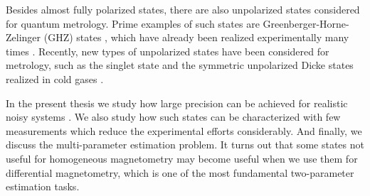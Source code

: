 Besides almost fully polarized states, there are also unpolarized states considered for quantum metrology.
Prime examples of such states are Greenberger-Horne-Zelinger (GHZ) states \cite{Greenberger1990}, which have already been realized experimentally many times \cite{Leibfried2004, Bouwmeester1999, Pan2000, Zhao2003, Lu2007, Gao2010, Sackett2000, Monz2011}.
Recently, new types of unpolarized states have been considered for metrology, such as the singlet state \cite{Urizar-Lanz2013, Behbood2014} and the symmetric unpolarized Dicke states realized in cold gases \cite{Luecke2011, Hamley2012, Krischek2011}.

In the present thesis we study how large precision can be achieved for realistic noisy systems \cite{Escher2011, Demkowicz-Dobrzanski2012}.
We also study how such states can be characterized with few measurements which reduce the experimental efforts considerably.
And finally, we discuss the multi-parameter estimation problem.
It turns out that some states not useful for homogeneous magnetometry may become useful when we use them for differential magnetometry, which is one of the most fundamental two-parameter estimation tasks.
